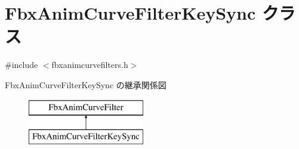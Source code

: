 \hypertarget{class_fbx_anim_curve_filter_key_sync}{}\section{Fbx\+Anim\+Curve\+Filter\+Key\+Sync クラス}
\label{class_fbx_anim_curve_filter_key_sync}


{\ttfamily \#include $<$fbxanimcurvefilters.\+h$>$}

Fbx\+Anim\+Curve\+Filter\+Key\+Sync の継承関係図\begin{figure}[H]
\begin{center}
\leavevmode
\includegraphics[height=2.000000cm]{class_fbx_anim_curve_filter_key_sync}
\end{center}
\end{figure}
